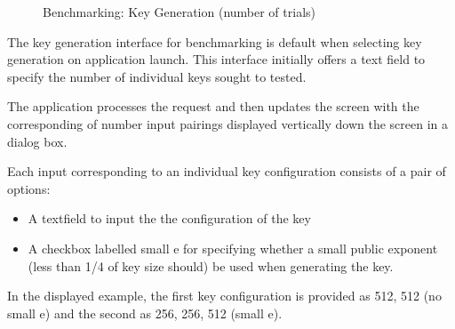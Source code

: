 \documentclass[]{final_report}
\begin{document}
\begin{figure}[H]
     \begin{minipage}{0.55\textwidth}
        \centering
       \caption{Benchmarking: Key Generation (number of trials)}
        \label{fig:image2}
    \end{minipage}
\end{figure}
The key generation interface for benchmarking is default when selecting key generation on application launch. This interface initially offers a text field to specify the number of individual keys sought to tested.

The application processes the request and then updates the screen with the corresponding of number input pairings displayed vertically down the screen in a dialog box.


Each input corresponding to an individual key configuration consists of a pair of options:
\begin{itemize}
    \item A textfield to input the the configuration of the key
    \item A checkbox labelled small e for specifying whether a small public exponent (less than 1/4 of key size should) be used when generating the key.
\end{itemize}
In the displayed example, the first key configuration is provided as 512, 512 (no small e) and the second as 256, 256, 512 (small e).
\end{document}

